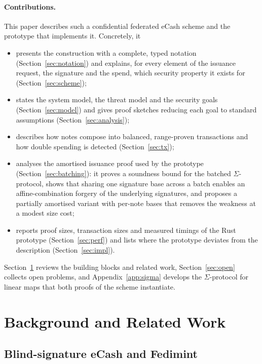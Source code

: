 \documentclass[10pt,a5paper]{article}
\begin{document}
\paragraph{Contributions.} This paper describes such a confidential federated
eCash scheme and the prototype that implements it. Concretely, it
\begin{itemize}[nosep]
  \item presents the construction with a complete, typed notation
        (Section~\ref{sec:notation}) and explains, for every element of the
        issuance request, the signature and the spend, which security property
        it exists for (Section~\ref{sec:scheme});
  \item states the system model, the threat model and the security goals
        (Section~\ref{sec:model}) and gives proof sketches reducing each goal to
        standard assumptions (Section~\ref{sec:analysis});
  \item describes how notes compose into balanced, range-proven transactions
        and how double spending is detected (Section~\ref{sec:tx});
  \item analyses the amortised issuance proof used by the prototype
        (Section~\ref{sec:batching}): it proves a soundness bound for the
        batched $\Sigma$-protocol, shows that sharing one signature base across
        a batch enables an affine-combination forgery of the underlying
        signatures, and proposes a partially amortised variant with per-note
        bases that removes the weakness at a modest size cost;
  \item reports proof sizes, transaction sizes and measured timings of the
        Rust prototype (Section~\ref{sec:perf}) and lists where the prototype
        deviates from the description (Section~\ref{sec:impl}).
\end{itemize}
Section~\ref{sec:background} reviews the building blocks and related work,
Section~\ref{sec:open} collects open problems, and Appendix~\ref{app:sigma}
develops the $\Sigma$-protocol for linear maps that both proofs of the scheme
instantiate.

\section{Background and Related Work}
\label{sec:background}

\subsection{Blind-signature eCash and Fedimint}
\end{document}
